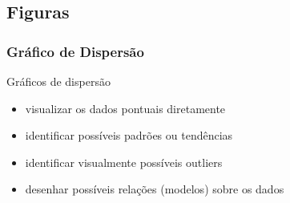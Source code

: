 \documentclass{beamer}
\begin{document}



\subsection{Figuras}

\subsubsection{Gráfico de Dispersão}

\begin{frame}{Gráficos de dispersão}
  \begin{itemize}
    \footnotesize
  \item visualizar os dados pontuais diretamente
    \bigskip
  \item identificar possíveis padrões ou tendências
    \bigskip
  \item identificar visualmente possíveis outliers
    \bigskip
  \item desenhar possíveis relações (modelos) sobre os dados
  \end{itemize}
\end{frame}
\end{document}
